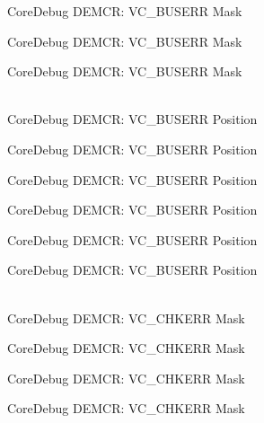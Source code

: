 \begin{DoxyRefList}
\label{deprecated__deprecated000422}%
%
Core\+Debug DEMCR:\+ VC\+\_\+\+BUSERR Mask 

\label{deprecated__deprecated000511}%
%
Core\+Debug DEMCR:\+ VC\+\_\+\+BUSERR Mask 

\label{deprecated__deprecated000613}%
%
Core\+Debug DEMCR:\+ VC\+\_\+\+BUSERR Mask  
\item[{\parbox[t]{\linewidth}{Global \doxylink{group__CMSIS__CoreDebug_gab8e3d8f0f9590a51bbf10f6da3ad6933}{Core\+Debug\+\_\+\+DEMCR\+\_\+\+VC\+\_\+\+BUSERR\+\_\+\+Pos} }}]\hfill \\
\label{deprecated__deprecated000059}%
%
Core\+Debug DEMCR:\+ VC\+\_\+\+BUSERR Position 

\label{deprecated__deprecated000203}%
%
Core\+Debug DEMCR:\+ VC\+\_\+\+BUSERR Position 

\label{deprecated__deprecated000345}%
%
Core\+Debug DEMCR:\+ VC\+\_\+\+BUSERR Position 

\label{deprecated__deprecated000421}%
%
Core\+Debug DEMCR:\+ VC\+\_\+\+BUSERR Position 

\label{deprecated__deprecated000510}%
%
Core\+Debug DEMCR:\+ VC\+\_\+\+BUSERR Position 

\label{deprecated__deprecated000612}%
%
Core\+Debug DEMCR:\+ VC\+\_\+\+BUSERR Position  
\item[{\parbox[t]{\linewidth}{Global \doxylink{group__CMSIS__CoreDebug_ga2f98b461d19746ab2febfddebb73da6f}{Core\+Debug\+\_\+\+DEMCR\+\_\+\+VC\+\_\+\+CHKERR\+\_\+\+Msk} }}]\hfill \\
\label{deprecated__deprecated000064}%
%
Core\+Debug DEMCR:\+ VC\+\_\+\+CHKERR Mask 

\label{deprecated__deprecated000208}%
%
Core\+Debug DEMCR:\+ VC\+\_\+\+CHKERR Mask 

\label{deprecated__deprecated000350}%
%
Core\+Debug DEMCR:\+ VC\+\_\+\+CHKERR Mask 

\label{deprecated__deprecated000426}%
%
Core\+Debug DEMCR:\+ VC\+\_\+\+CHKERR Mask 


\end{DoxyRefList}
